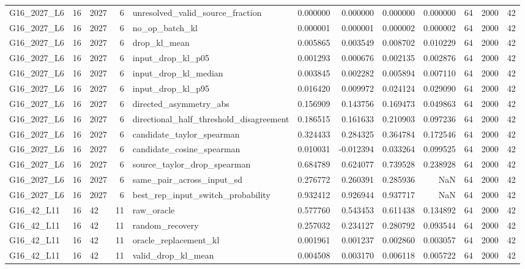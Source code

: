 \begin{tabular}{lrlrlrrrrrrr}
G16_2027_L6 & 16 & 2027 & 6 & unresolved_valid_source_fraction & 0.000000 & 0.000000 & 0.000000 & 0.000000 & 64 & 2000 & 42 \\
G16_2027_L6 & 16 & 2027 & 6 & no_op_batch_kl & 0.000001 & 0.000001 & 0.000002 & 0.000002 & 64 & 2000 & 42 \\
G16_2027_L6 & 16 & 2027 & 6 & drop_kl_mean & 0.005865 & 0.003549 & 0.008702 & 0.010229 & 64 & 2000 & 42 \\
G16_2027_L6 & 16 & 2027 & 6 & input_drop_kl_p05 & 0.001293 & 0.000676 & 0.002135 & 0.002876 & 64 & 2000 & 42 \\
G16_2027_L6 & 16 & 2027 & 6 & input_drop_kl_median & 0.003845 & 0.002282 & 0.005894 & 0.007110 & 64 & 2000 & 42 \\
G16_2027_L6 & 16 & 2027 & 6 & input_drop_kl_p95 & 0.016420 & 0.009972 & 0.024124 & 0.029090 & 64 & 2000 & 42 \\
G16_2027_L6 & 16 & 2027 & 6 & directed_asymmetry_abs & 0.156909 & 0.143756 & 0.169473 & 0.049863 & 64 & 2000 & 42 \\
G16_2027_L6 & 16 & 2027 & 6 & directional_half_threshold_disagreement & 0.186515 & 0.161633 & 0.210903 & 0.097236 & 64 & 2000 & 42 \\
G16_2027_L6 & 16 & 2027 & 6 & candidate_taylor_spearman & 0.324433 & 0.284325 & 0.364784 & 0.172546 & 64 & 2000 & 42 \\
G16_2027_L6 & 16 & 2027 & 6 & candidate_cosine_spearman & 0.010031 & -0.012394 & 0.033264 & 0.099525 & 64 & 2000 & 42 \\
G16_2027_L6 & 16 & 2027 & 6 & source_taylor_drop_spearman & 0.684789 & 0.624077 & 0.739528 & 0.238928 & 64 & 2000 & 42 \\
G16_2027_L6 & 16 & 2027 & 6 & same_pair_across_input_sd & 0.276772 & 0.260391 & 0.285936 & NaN & 64 & 2000 & 42 \\
G16_2027_L6 & 16 & 2027 & 6 & best_rep_input_switch_probability & 0.932412 & 0.926944 & 0.937717 & NaN & 64 & 2000 & 42 \\
G16_42_L11 & 16 & 42 & 11 & raw_oracle & 0.577760 & 0.543453 & 0.611438 & 0.134892 & 64 & 2000 & 42 \\
G16_42_L11 & 16 & 42 & 11 & random_recovery & 0.257032 & 0.234127 & 0.280792 & 0.093544 & 64 & 2000 & 42 \\
G16_42_L11 & 16 & 42 & 11 & oracle_replacement_kl & 0.001961 & 0.001237 & 0.002860 & 0.003057 & 64 & 2000 & 42 \\
G16_42_L11 & 16 & 42 & 11 & valid_drop_kl_mean & 0.004508 & 0.003170 & 0.006118 & 0.005722 & 64 & 2000 & 42 \\

\end{tabular}
